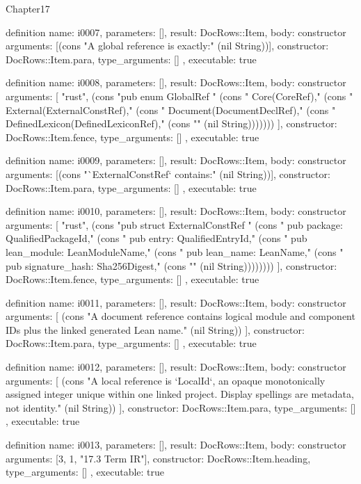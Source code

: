 \begin{lexlean}{Chapter17}
\begin{semanticmodule}
definition{
  name: i0007,
  parameters: [],
  result: DocRows::Item,
  body: constructor{
    arguments: [(cons "A global reference is exactly:" (nil String))],
    constructor: DocRows::Item.para,
    type_arguments: []
  },
  executable: true
}

definition{
  name: i0008,
  parameters: [],
  result: DocRows::Item,
  body: constructor{
    arguments: [
      "rust",
      (cons "pub enum GlobalRef {" (cons "    Core(CoreRef)," (cons "    External(ExternalConstRef)," (cons "    Document(DocumentDeclRef)," (cons "    DefinedLexicon(DefinedLexiconRef)," (cons "}" (nil String)))))))
    ],
    constructor: DocRows::Item.fence,
    type_arguments: []
  },
  executable: true
}

definition{
  name: i0009,
  parameters: [],
  result: DocRows::Item,
  body: constructor{
    arguments: [(cons "`ExternalConstRef` contains:" (nil String))],
    constructor: DocRows::Item.para,
    type_arguments: []
  },
  executable: true
}

definition{
  name: i0010,
  parameters: [],
  result: DocRows::Item,
  body: constructor{
    arguments: [
      "rust",
      (cons "pub struct ExternalConstRef {" (cons "    pub package: QualifiedPackageId," (cons "    pub entry: QualifiedEntryId," (cons "    pub lean_module: LeanModuleName," (cons "    pub lean_name: LeanName," (cons "    pub signature_hash: Sha256Digest," (cons "}" (nil String))))))))
    ],
    constructor: DocRows::Item.fence,
    type_arguments: []
  },
  executable: true
}

definition{
  name: i0011,
  parameters: [],
  result: DocRows::Item,
  body: constructor{
    arguments: [
      (cons "A document reference contains logical module and component IDs plus the linked generated Lean name." (nil String))
    ],
    constructor: DocRows::Item.para,
    type_arguments: []
  },
  executable: true
}

definition{
  name: i0012,
  parameters: [],
  result: DocRows::Item,
  body: constructor{
    arguments: [
      (cons "A local reference is `LocalId`, an opaque monotonically assigned integer unique within one linked project. Display spellings are metadata, not identity." (nil String))
    ],
    constructor: DocRows::Item.para,
    type_arguments: []
  },
  executable: true
}

definition{
  name: i0013,
  parameters: [],
  result: DocRows::Item,
  body: constructor{
    arguments: [3, 1, "17.3 Term IR"],
    constructor: DocRows::Item.heading,
    type_arguments: []
  },
  executable: true
}


\end{semanticmodule}
\end{lexlean}
